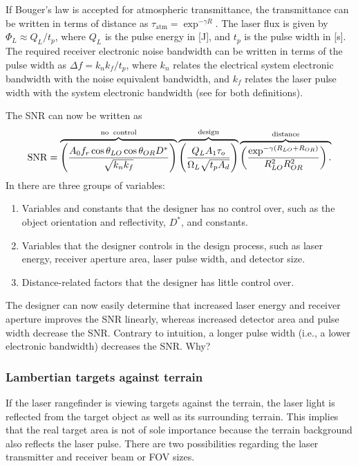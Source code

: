 If Bouger's law is accepted for atmospheric transmittance, the transmittance can be written in terms of distance as $\tau_\textrm{atm}=\exp^{-\gamma R}$. The laser flux is given by $\Phi_L\approx Q_L/t_p$, where $Q_L$ is the pulse
energy in [J], and $t_p$ is the pulse width in [s]. The required receiver
electronic noise bandwidth can be written in terms of the pulse width as
$\Delta f=k_nk_f/t_p$, where 
$k_n$ relates the electrical system electronic bandwidth with the noise equivalent bandwidth, and 
$k_f$ relates the laser pulse width with the system electronic bandwidth (see \cite{Willers2013} for both definitions).

The SNR can now be written as
\begin{equation}
\operatorname{SNR} = 
\overbrace{
\left(\frac{A_0f_r  \cos\theta_{LO} \cos\theta_{OR} D^\ast }{\sqrt{k_nk_f}}\right)
}^{\rm no\;\;control}
\overbrace{
\left(\frac{Q_L A_1 \tau_o }{\Omega_L\sqrt{t_p A_d}}\right)
}^{\rm design}
\overbrace{
\left(\frac{\exp^{-\gamma (R_{LO}+R_{OR})} }{R^2_{LO}R^2_{OR}}\right).\\
}^{\rm distance}
\label{lrfd2}
\end{equation}
In  there are three groups of variables:

\begin{enumerate}[1.]

\item 
Variables and constants that the designer has no control over, such as the object orientation and reflectivity, $D^\ast$, and constants.

\item 
Variables that the designer controls in the design process, such as laser energy, receiver aperture area, laser pulse width, and detector size.

\item 
Distance-related factors that the designer has little control over.

\end{enumerate}

The designer can now easily determine that increased laser energy and receiver aperture improves the SNR linearly, whereas increased detector area and pulse width decrease the SNR. Contrary to intuition, a longer pulse width (i.e., a lower electronic bandwidth) decreases the SNR. Why?


\subsubsection{Lambertian targets against terrain}
\noindent
If the laser rangefinder is viewing targets against the terrain, the laser light is reflected from the target object as well as its  surrounding terrain. This implies that the real target area is not of sole importance because the terrain background also reflects the laser pulse. There are two possibilities regarding the laser transmitter and receiver beam or FOV sizes.



